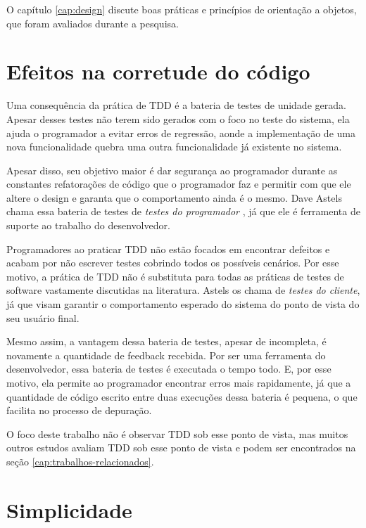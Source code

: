 O capítulo \ref{cap:design} discute boas práticas e princípios de orientação a
objetos, que foram avaliados durante a pesquisa.

\section{Efeitos na corretude do código}

Uma consequência da prática de TDD é a bateria de testes de unidade gerada.
Apesar desses testes não terem sido gerados com o foco no teste do sistema, 
ela ajuda o programador a evitar erros de regressão, aonde a implementação de
uma nova funcionalidade quebra uma outra funcionalidade já existente no sistema.

Apesar disso, seu objetivo maior é dar segurança ao programador durante as
constantes refatorações de código que o programador faz e permitir com que ele
altere o design e garanta que o comportamento ainda é o mesmo. Dave Astels chama
essa bateria de testes de \textit{testes do programador} \cite{astels-tdd}, já
que ele é ferramenta de suporte ao trabalho do desenvolvedor.

Programadores ao praticar TDD não estão focados em encontrar defeitos e
acabam por não escrever testes cobrindo todos os possíveis cenários. Por esse
motivo, a prática de TDD não é substituta para todas as práticas de testes de
software vastamente discutidas na literatura. Astels os chama de \textit{testes do
cliente}, já que visam garantir o comportamento esperado do sistema do ponto de
vista do seu usuário final.

Mesmo assim, a vantagem dessa bateria de testes, apesar de incompleta, é
novamente a quantidade de feedback recebida. Por ser uma ferramenta do
desenvolvedor, essa bateria de testes é executada o tempo todo. E, por esse
motivo, ela permite ao programador encontrar erros mais rapidamente, já que a
quantidade de código escrito entre duas execuções dessa bateria é pequena, o que
facilita no processo de depuração.

O foco deste trabalho não é observar TDD sob esse ponto de vista, mas muitos
outros estudos avaliam TDD sob esse ponto de vista e podem ser encontrados na
seção \ref{cap:trabalhos-relacionados}.

\section{Simplicidade}

